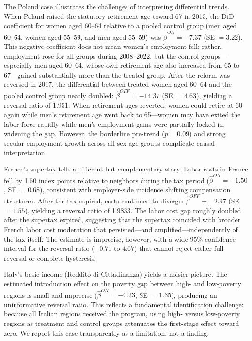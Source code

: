 \documentclass[12pt]{article}
\begin{document}
The Poland case illustrates the challenges of interpreting differential trends. When Poland raised the statutory retirement age toward 67 in 2013, the DiD coefficient for women aged 60--64 relative to a pooled control group (men aged 60--64, women aged 55--59, and men aged 55--59) was $\hat{\beta}^{ON} = -7.37$ (SE $= 3.22$). This negative coefficient does not mean women's employment fell; rather, employment rose for all groups during 2008--2022, but the control groups---especially men aged 60--64, whose own retirement age also increased from 65 to 67---gained substantially more than the treated group. After the reform was reversed in 2017, the differential between treated women aged 60--64 and the pooled control group nearly doubled: $\hat{\beta}^{OFF} = -14.37$ (SE $= 4.63$), yielding a reversal ratio of 1.951. When retirement ages reverted, women could retire at 60 again while men's retirement age went back to 65---women may have exited the labor force rapidly while men's employment gains were partially locked in, widening the gap. However, the borderline pre-trend ($p = 0.09$) and strong secular employment growth across all sex-age groups complicate causal interpretation.

France's supertax tells a different but complementary story. Labor costs in France fell by 1.50 index points relative to neighbors during the tax period ($\hat{\beta}^{ON} = -1.50$, SE $= 0.68$), consistent with employer-side incidence shifting compensation structures. After the tax expired, costs continued to diverge: $\hat{\beta}^{OFF} = -2.97$ (SE $= 1.55$), yielding a reversal ratio of 1.9833. The labor cost gap roughly doubled after the supertax expired, suggesting that the supertax coincided with broader French labor cost moderation that persisted---and amplified---independently of the tax itself. The estimate is imprecise, however, with a wide 95\% confidence interval for the reversal ratio ($-0.71$ to $4.67$) that cannot reject either full reversal or complete hysteresis.

Italy's basic income (Reddito di Cittadinanza) yields a noisier picture. The estimated introduction effect on the poverty gap between high- and low-poverty regions is small and imprecise ($\hat{\beta}^{ON} = -0.23$, SE $= 1.35$), producing an uninformative reversal ratio. This reflects a fundamental identification challenge: because all Italian regions received the program, using high- versus low-poverty regions as treatment and control groups attenuates the first-stage effect toward zero. We report this case transparently as a limitation, not a finding.
\end{document}
